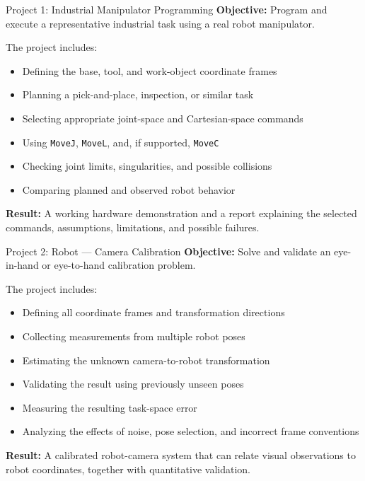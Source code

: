 \documentclass[aspectratio=169]{beamer}
\begin{document}
\begin{frame}[t]{Project 1: Industrial Manipulator Programming}
    \small
 \vspace*{-0.3cm}
    \textbf{Objective:}
    Program and execute a representative industrial task using
    a real robot manipulator.

    \medskip

    The project includes:
    \begin{itemize}
        \item Defining the base, tool, and work-object coordinate frames
        \item Planning a pick-and-place, inspection, or similar task
        \item Selecting appropriate joint-space and Cartesian-space commands
        \item Using \texttt{MoveJ}, \texttt{MoveL}, and, if supported,
        \texttt{MoveC}
        \item Checking joint limits, singularities, and possible collisions
        \item Comparing planned and observed robot behavior
    \end{itemize}

    \textbf{Result:}
    A working hardware demonstration and a report explaining the
    selected commands, assumptions, limitations, and possible failures.
\end{frame}

\begin{frame}[t]{Project 2: Robot --- Camera Calibration}
    \small
 \vspace*{-0.3cm}
    \textbf{Objective:}
    Solve and validate an eye-in-hand or eye-to-hand calibration problem.

    \medskip

    The project includes:
    \begin{itemize}
        \item Defining all coordinate frames and transformation directions
        \item Collecting measurements from multiple robot poses
        \item Estimating the unknown camera-to-robot transformation
        \item Validating the result using previously unseen poses
        \item Measuring the resulting task-space error
        \item Analyzing the effects of noise, pose selection,
        and incorrect frame conventions
    \end{itemize}

    \textbf{Result:}
    A calibrated robot-camera system that can relate visual observations
    to robot coordinates, together with quantitative validation.
\end{frame}
\end{document}
